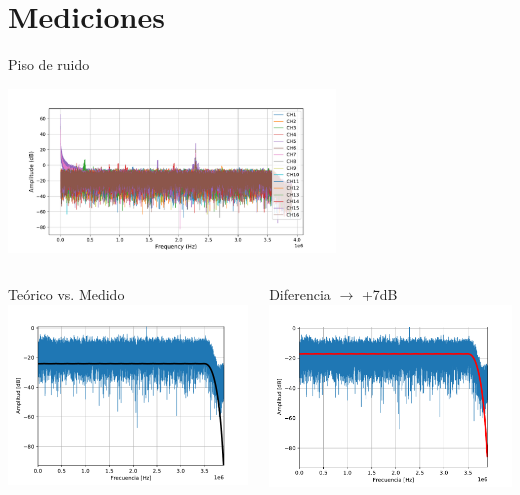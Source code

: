 \documentclass[ignorenonframetext,12pt]{beamer}
\begin{document}
\section{Mediciones}
				\begin{frame}{Piso de ruido}
								\begin{center}
																\includegraphics[width=0.65\textwidth]{noise_floor_rxch16}
								\end{center}
								\begin{columns}
												\begin{column}{0.5\textwidth}{\footnotesize{Teórico vs.
																Medido}}
																\includegraphics[width=\textwidth]{ch1}
												\end{column}
												\begin{column}{0.5\textwidth}{\footnotesize{Diferencia
																$\to$ +7dB}}
																\includegraphics[width=\textwidth]{ch1_plus7dB}

\end{column}
\end{columns}
\end{frame}
\end{document}
